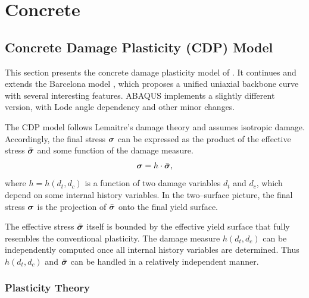 \chapter{Concrete}
\section{Concrete Damage Plasticity (CDP) Model}
This section presents the concrete damage plasticity model of \cite{Lee1998}.
It continues and extends the Barcelona model \cite{Lubliner1989}, which proposes a unified uniaxial backbone curve with several interesting features.
ABAQUS implements a slightly different version, with Lode angle dependency and other minor changes.

The CDP model follows Lemaitre's damage theory \cite{Lemaitre1985} and assumes isotropic damage.
Accordingly, the final stress $\bm{\sigma}$ can be expressed as the product of the effective stress $\bar{\bm{\sigma}}$ and some function of the damage measure.
\begin{gather}
\bm{\sigma}=h\cdot\bar{\bm{\sigma}},
\end{gather}
where $h=h\left(d_t,d_c\right)$ is a function of two damage variables $d_t$ and $d_c$, which depend on some internal history variables.
In the two--surface picture, the final stress $\bm{\sigma}$ is the projection of $\bar{\bm{\sigma}}$ onto the final yield surface.

The effective stress $\bar{\bm{\sigma}}$ itself is bounded by the effective yield surface that fully resembles the conventional plasticity.
The damage measure $h\left(d_t,d_c\right)$ can be independently computed once all internal history variables are determined.
Thus $h\left(d_t,d_c\right)$ and $\bar{\bm{\sigma}}$ can be handled in a relatively independent manner.
\subsection{Plasticity Theory}
